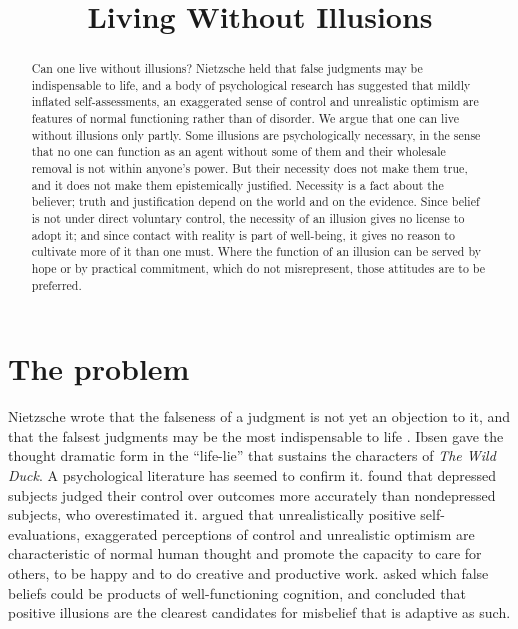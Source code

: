 \documentclass{situationist-preprint}
\title{Living Without Illusions}
\begin{document}
\maketitle

\begin{abstract}
Can one live without illusions? Nietzsche held that false judgments may be indispensable to life, and a body of psychological research has suggested that mildly inflated self-assessments, an exaggerated sense of control and unrealistic optimism are features of normal functioning rather than of disorder. We argue that one can live without illusions only partly. Some illusions are psychologically necessary, in the sense that no one can function as an agent without some of them and their wholesale removal is not within anyone's power. But their necessity does not make them true, and it does not make them epistemically justified. Necessity is a fact about the believer; truth and justification depend on the world and on the evidence. Since belief is not under direct voluntary control, the necessity of an illusion gives no license to adopt it; and since contact with reality is part of well-being, it gives no reason to cultivate more of it than one must. Where the function of an illusion can be served by hope or by practical commitment, which do not misrepresent, those attitudes are to be preferred.
\end{abstract}

\section{The problem}

Nietzsche wrote that the falseness of a judgment is not yet an objection to it, and that the falsest judgments may be the most indispensable to life \citep[\S4]{Nietzsche1886}. Ibsen gave the thought dramatic form in the \enquote{life-lie} that sustains the characters of \emph{The Wild Duck}. A psychological literature has seemed to confirm it. \citet{Alloy1979} found that depressed subjects judged their control over outcomes more accurately than nondepressed subjects, who overestimated it. \citet{Taylor1988} argued that unrealistically positive self-evaluations, exaggerated perceptions of control and unrealistic optimism are characteristic of normal human thought and promote the capacity to care for others, to be happy and to do creative and productive work. \citet{McKay2009} asked which false beliefs could be products of well-functioning cognition, and concluded that positive illusions are the clearest candidates for misbelief that is adaptive as such.
\end{document}
